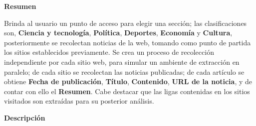 
\begin{large}
	\textbf{Resumen}\\
\end{large}

Brinda al usuario un punto de acceso para elegir una sección; las clasificaciones son, \textbf{Ciencia y tecnología}, \textbf{Política}, \textbf{Deportes}, \textbf{Economía} y  \textbf{Cultura}, posteriormente se recolectan noticias de la web, tomando como punto de partida los sitios establecidos previamente. Se crea un proceso de recolección independiente por cada sitio web, para simular un ambiente de extracción en paralelo; de cada sitio se recolectan las noticias publicadas; de cada artículo se obtiene \textbf{Fecha de publicación}, \textbf{Título}, \textbf{Contenido}, \textbf{URL de la noticia}, y de contar con ello el \textbf{Resumen}. Cabe destacar que las ligas contenidas en los sitios visitados son extraídas para su posterior análisis.\\

\begin{large}
	\textbf{Descripción}\\
\end{large} 



